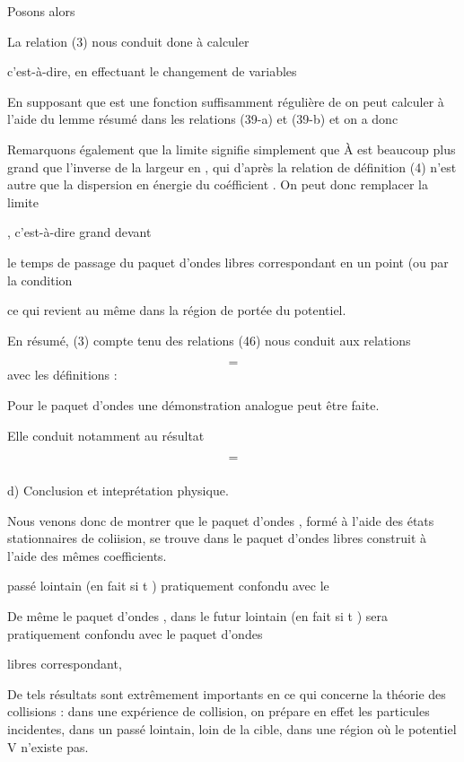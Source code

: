 Posons alors

La relation (3) nous conduit done à calculer

c'est-à-dire, en effectuant le changement de variables 

En supposant que  est une fonction suffisamment régulière
de  on peut calculer  à l'aide du lemme résumé dans les
relations (39-a) et (39-b) et on a donc


Remarquons également que la limite  signifie simplement que À
est beaucoup plus grand que l'inverse de la largeur en ,
qui d'après la relation de définition (4) n'est autre que la dispersion en
énergie  du coéfficient . On peut donc remplacer la limite

, c'est-à-dire  grand devant

le temps de passage du paquet d'ondes libres correspondant en un point (ou
 par la condition

ce qui revient au même dans la région de portée du potentiel.

En résumé, (3) compte tenu des relations (46) nous conduit aux
relations

\[
\tag{472}=
\]
avec les définitions :

Pour le paquet d'ondes  une démonstration analogue peut être faite.

Elle conduit notamment au résultat

\[
\tag{48}=
\]

\subsubsection{}%
d) Conclusion et inteprétation physique.

Nous venons donc de montrer que le paquet d'ondes  ,
formé à l'aide des états stationnaires de coliision, se trouve dans le
paquet d'ondes libres  construit à l'aide des mêmes coefficients.

passé lointain (en fait si t ) pratiquement confondu avec le

De même le paquet d'ondes  , dans le futur lointain
(en fait si t  ) sera pratiquement confondu avec le paquet d'ondes

libres  correspondant,

De tels résultats sont extrêmement importants en ce qui concerne
la théorie des collisions : dans une expérience de collision, on prépare
en effet les particules incidentes, dans un passé lointain, loin de la
cible, dans une région où le potentiel V n'existe pas.

